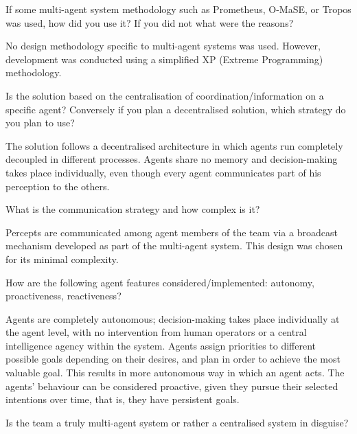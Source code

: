 \begin{question}
If some multi-agent system methodology such as Prometheus, O-MaSE, or Tropos was
used, how did you use it? If you did not what were the reasons?  
\end{question}

No design methodology specific to multi-agent systems was used. However,
development was conducted using a simplified XP (Extreme Programming)
methodology. 

\begin{question}
Is the solution based on the centralisation of coordination/information on
a specific agent? Conversely if you plan a decentralised solution, which
strategy do you plan to use?  
\end{question}

The solution follows a decentralised architecture in which agents run completely
decoupled in different processes. Agents share no memory and decision-making
takes place individually, even though every agent communicates part of his
perception to the others.

\begin{question}
What is the communication strategy and how complex is it?
\end{question}

Percepts are communicated among agent members of the team via a broadcast
mechanism developed as part of the multi-agent system. This design was chosen
for its minimal complexity.

\begin{question}
How are the following agent features considered/implemented: autonomy,
proactiveness, reactiveness?  
\end{question}

Agents are completely autonomous; decision-making takes place individually at
the agent level, with no intervention from human operators or a central
intelligence agency within the system. Agents assign priorities to different
possible goals depending on their desires, and plan in order to achieve the most
valuable goal. This results in more autonomous way in which an agent acts.  The
agents' behaviour can be considered proactive, given they pursue their selected
intentions over time, that is, they have persistent goals.

\begin{question}
Is the team a truly multi-agent system or rather a centralised system in
disguise?  
\end{question}

